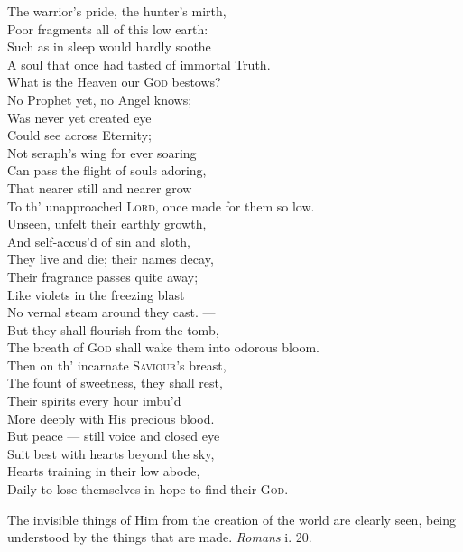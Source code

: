  The warrior’s pride, the hunter’s mirth, \\
 Poor fragments all of this low earth: \\
 Such as in sleep would hardly soothe \\
 A soul that once had tasted of immortal Truth. \\
  What is the Heaven our \textsc{God} bestows? \\
 No Prophet yet, no Angel knows; \\
 Was never yet created eye \\
 Could see across Eternity; \\
 Not seraph’s wing for ever soaring \\
 Can pass the flight of souls adoring, \\
 That nearer still and nearer grow \\
 To th’ unapproached \textsc{Lord}, once made for them so low. \\
  Unseen, unfelt their earthly growth, \\
 And self-accus’d of sin and sloth, \\
 They live and die; their names decay, \\
 Their fragrance passes quite away; \\
 Like violets in the freezing blast \\
 No vernal steam around they cast. — \\
 But they shall flourish from the tomb, \\
 The breath of \textsc{God} shall wake them into odorous bloom. \\
  Then on th’ incarnate \textsc{Saviour}’s breast, \\
 The fount of sweetness, they shall rest, \\
 Their spirits every hour imbu’d \\
 More deeply with His precious blood. \\
 But peace — still voice and closed eye \\
 Suit best with hearts beyond the sky, \\
 Hearts training in their low abode, \\
 Daily to lose themselves in hope to find their \textsc{God}.\\


The invisible things of Him from the creation of the world are clearly seen, being understood by the things that are made. \emph{Romans} i. 20.

